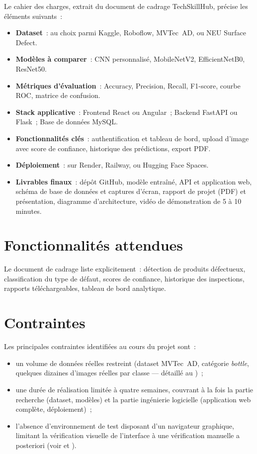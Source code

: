 Le cahier des charges, extrait du document de cadrage TechSkillHub, pr\'ecise les \'el\'ements suivants~:
\begin{itemize}
  \item \textbf{Dataset}~: au choix parmi Kaggle, Roboflow, MVTec~AD, ou NEU Surface Defect.
  \item \textbf{Mod\`eles \`a comparer}~: CNN personnalis\'e, MobileNetV2, EfficientNetB0, ResNet50.
  \item \textbf{M\'etriques d'\'evaluation}~: Accuracy, Precision, Recall, F1-score, courbe ROC, matrice de confusion.
  \item \textbf{Stack applicative}~: Frontend React ou Angular~; Backend FastAPI ou Flask~; Base de donn\'ees MySQL.
  \item \textbf{Fonctionnalit\'es cl\'es}~: authentification et tableau de bord, upload d'image avec score de confiance, historique des pr\'edictions, export PDF.
  \item \textbf{D\'eploiement}~: sur Render, Railway, ou Hugging Face Spaces.
  \item \textbf{Livrables finaux}~: d\'ep\^ot GitHub, mod\`ele entra\^in\'e, API et application web, sch\'ema de base de donn\'ees et captures d'\'ecran, rapport de projet (PDF) et pr\'esentation, diagramme d'architecture, vid\'eo de d\'emonstration de 5 \`a 10 minutes.
\end{itemize}

\section{Fonctionnalit\'es attendues}

Le document de cadrage liste explicitement~: d\'etection de produits d\'efectueux, classification du type de d\'efaut, scores de confiance, historique des inspections, rapports t\'el\'echargeables, tableau de bord analytique.

\section{Contraintes}

Les principales contraintes identifi\'ees au cours du projet sont~:
\begin{itemize}
  \item un volume de donn\'ees r\'eelles restreint (dataset MVTec~AD, cat\'egorie \emph{bottle}, quelques dizaines d'images r\'eelles par classe --- d\'etaill\'e au )~;
  \item une dur\'ee de r\'ealisation limit\'ee \`a quatre semaines, couvrant \`a la fois la partie recherche (dataset, mod\`eles) et la partie ing\'enierie logicielle (application web compl\`ete, d\'eploiement)~;
  \item l'absence d'environnement de test disposant d'un navigateur graphique, limitant la v\'erification visuelle de l'interface \`a une v\'erification manuelle a posteriori (voir  et ).
\end{itemize}

